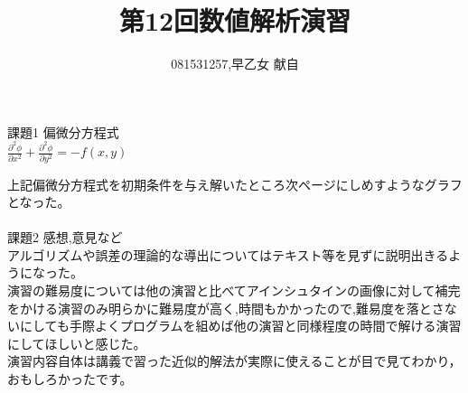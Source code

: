 \documentclass[]{jsarticle}
\title{第12回数値解析演習}
\author{081531257,早乙女 献自}
\date{}
\begin{document}
\maketitle
課題1 偏微分方程式\\
$\frac{\partial^2 \phi}{\partial x^2}+\frac{\partial^2 \phi}{\partial y^2} = -f(x,y)$

上記偏微分方程式を初期条件を与え解いたところ次ページにしめすようなグラフとなった。\\\\
課題2 感想,意見など\\
アルゴリズムや誤差の理論的な導出についてはテキスト等を見ずに説明出きるようになった。\\
演習の難易度については他の演習と比べてアインシュタインの画像に対して補完をかける演習のみ明らかに難易度が高く,時間もかかったので,難易度を落とさないにしても手際よくプログラムを組めば他の演習と同様程度の時間で解ける演習にしてほしいと感じた。\\
演習内容自体は講義で習った近似的解法が実際に使えることが目で見てわかり，おもしろかったです。
\end{document}
